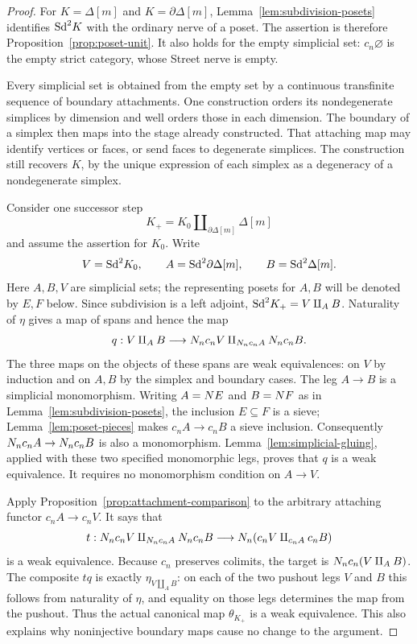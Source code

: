 \begin{proof}
For $K=\Delta[m]$ and $K=\partial\Delta[m]$,
Lemma~\ref{lem:subdivision-posets} identifies $\mathrm{Sd}^2K$ with the
ordinary nerve of a poset.  The assertion is therefore
Proposition~\ref{prop:poset-unit}.  It also holds for the empty
simplicial set: $c_n\varnothing$ is the empty strict category,
whose Street nerve is empty.

Every simplicial set is obtained from the empty set by a
continuous transfinite sequence of boundary attachments.  One
construction orders its nondegenerate simplices by dimension and
well orders those in each dimension.  The boundary of a simplex
then maps into the stage already constructed.  That attaching
map may identify vertices or faces, or send faces to degenerate
simplices.  The construction still recovers $K$, by the unique
expression of each simplex as a degeneracy of a nondegenerate
simplex.

Consider one successor step
\[
 K_+=K_0\amalg_{\partial\Delta[m]}\Delta[m]
\]
and assume the assertion for $K_0$.  Write
\[
 V=\mathrm{Sd}^2K_0,\qquad A=\mathrm{Sd}^2\partial\Delta[m],
 \qquad B=\mathrm{Sd}^2\Delta[m].
\]
Here $A,B,V$ are simplicial sets; the representing posets for $A,B$
will be denoted by $E,F$ below. Since subdivision is a left adjoint,
$\mathrm{Sd}^2K_+=V\amalg_A B$.  Naturality of $\eta$ gives a map of
spans and hence the map
\begin{equation}\label{eq:unit-gluing-map}
 q:V\amalg_A B\longrightarrow
       N_n c_nV\amalg_{N_n c_nA}N_n c_nB.
\end{equation}
The three maps on the objects of these spans are weak
equivalences: on $V$ by induction and on $A,B$ by the simplex and
boundary cases.  The leg $A\to B$ is a simplicial monomorphism.
Writing $A=N E$ and $B=N F$ as in
Lemma~\ref{lem:subdivision-posets}, the inclusion $E\subseteq F$
is a sieve; Lemma~\ref{lem:poset-pieces} makes
$c_nA\to c_nB$ a sieve inclusion.  Consequently
$N_n c_nA\to N_n c_nB$ is also a monomorphism.
Lemma~\ref{lem:simplicial-gluing}, applied with these two
specified monomorphic legs, proves that $q$ is a weak equivalence.
It requires no monomorphism condition on $A\to V$.

Apply Proposition~\ref{prop:attachment-comparison} to the
arbitrary attaching functor $c_nA\to c_nV$.  It says that
\begin{equation}\label{eq:unit-attachment-comparison}
 t:N_n c_nV\amalg_{N_n c_nA}N_n c_nB
       \longrightarrow
       N_n(c_nV\amalg_{c_nA}c_nB)
\end{equation}
is a weak equivalence.  Because $c_n$ preserves colimits, the
target is $N_n c_n(V\amalg_A B)$.
The composite $tq$ is exactly $\eta_{V\amalg_A B}$: on each of
the two pushout legs $V$ and $B$ this follows from naturality of
$\eta$, and equality on those legs determines the map from the
pushout.  Thus the actual canonical map
$\theta_{K_+}$ is a weak equivalence.  This also explains why
noninjective boundary maps cause no change to the argument.


\end{proof}
